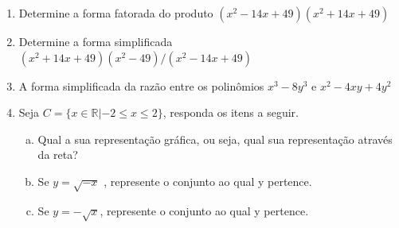 \documentclass[12pt,onepage,a4paper]{memoir}
\begin{document}
\begin{enumerate}
\item Determine a forma fatorada do produto $(x^2 - 14x + 49 )(x^2 + 14x + 49 )$
\item Determine a forma simplificada $(x^2 + 14x + 49)( x^2 - 49)/(x^2 - 14x +
  49)$
  \item  A forma simplificada da razão entre os polinômios $x^3 - 8y^3$ e $x^2 -
    4xy + 4y^2$

  \item Seja $C=\{ x \in \mathbb{R} | -2 \leq x \leq 2  \}$, responda os itens a seguir.  

    \begin{enumerate}[a)]
    \item  Qual a sua representação gráfica, ou seja, qual sua representação
      através da reta?
    \item  Se $y = \sqrt{-x}$ , represente o conjunto ao qual y pertence.
    \item Se $y = -\sqrt{x}$, represente o conjunto ao qual y pertence.
    \end{enumerate}


    
\end{enumerate} %
\end{document}
